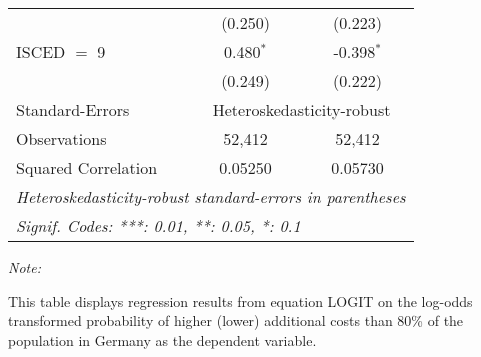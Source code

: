 \begin{table}[htbp!]
\begin{adjustbox}{width = 1\textwidth, max height = 0.95\textheight, center}
\begin{threeparttable}[b]
\begin{tabular}{lcc}
                                 & (0.250)        & (0.223)\\   
            ISCED $=$ 9          & 0.480$^{*}$    & -0.398$^{*}$\\   
                                 & (0.249)        & (0.222)\\   
            \midrule 
            Standard-Errors & \multicolumn{2}{c}{Heteroskedasticity-robust} \\ 
            Observations         & 52,412         & 52,412\\  
            Squared Correlation  & 0.05250        & 0.05730\\  
            \midrule \midrule
            \multicolumn{3}{l}{\emph{Heteroskedasticity-robust standard-errors in parentheses}}\\
            \multicolumn{3}{l}{\emph{Signif. Codes: ***: 0.01, **: 0.05, *: 0.1}}\\
         \end{tabular}
         
         \begin{tablenotes}\item \medskip \textit{Note:}
            \item This table displays regression results from equation LOGIT on the log-odds transformed probability of higher (lower) additional costs than 80\% of the population in Germany as the dependent variable. 
         \end{tablenotes}
      \end{threeparttable}
   \end{adjustbox}
\end{table}


